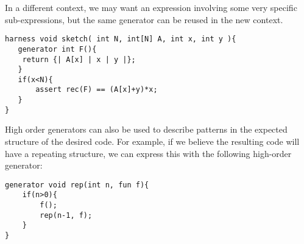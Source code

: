 In a different context, we may want an expression involving some very specific sub-expressions, but the same generator can be reused in the new context.
\begin{lstlisting}
harness void sketch( int N, int[N] A, int x, int y ){   
   generator int F(){
	return {| A[x] | x | y |};
   }
   if(x<N){
	   assert rec(F) == (A[x]+y)*x;
   }
}
\end{lstlisting}

High order generators can also be used to describe patterns in the expected structure of the desired code. For example, if we believe the resulting code will have a repeating structure, we can express this with the following high-order generator: 

\begin{lstlisting}
generator void rep(int n, fun f){
    if(n>0){
        f();
        rep(n-1, f);
    }    
}
\end{lstlisting}
